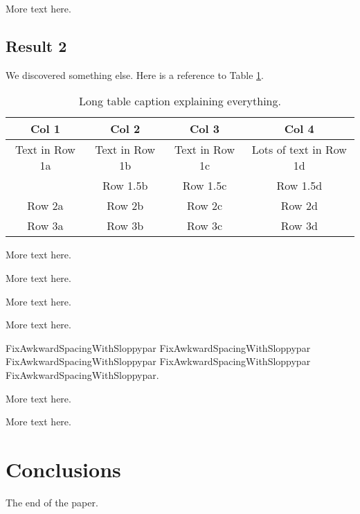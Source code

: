 \documentclass[main.tex]{subfiles}
\begin{document}
More text here.

\subsection{Result 2}
We discovered something else. Here is a reference to Table \ref{tab:paper1_tab1}.

\renewcommand{\arraystretch}{2}  %
\begin{table}[hbt!]
\centering
\begin{tabularx}{\textwidth}{c|c|c|c}  %
   \textbf{Col 1} & \textbf{Col 2} & \textbf{Col 3} & \textbf{Col 4} \\
   \hline  %
   Text in Row 1a & Text in Row 1b & Text in Row 1c & Lots of text in Row 1d \\
                  & Row 1.5b & Row 1.5c & Row 1.5d \\
   \hline
   Row 2a & Row 2b & Row 2c & Row 2d \\
   \hline
   Row 3a & Row 3b & Row 3c & Row 3d \\
\end{tabularx}
\caption[Short table caption for List of Tables]{Long table caption explaining everything.}
\label{tab:paper1_tab1}
\end{table}

More text here.

More text here.

More text here.

More text here.

\begin{sloppypar}
FixAwkwardSpacingWithSloppypar FixAwkwardSpacingWithSloppypar FixAwkwardSpacingWithSloppypar FixAwkwardSpacingWithSloppypar FixAwkwardSpacingWithSloppypar.
\end{sloppypar}

More text here.

More text here.

\section{Conclusions}
The end of the paper.

\end{document}
